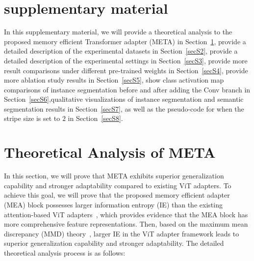 \newpage
\section*{supplementary material}
In this supplementary material, we will provide a theoretical analysis to the proposed memory efficient Transformer adapter (META) in Section~\ref{secS1}, provide a detailed description of the experimental datasets in Section~\ref{secS2}, provide a detailed description of the experimental settings in Section~\ref{secS3},
provide more result comparisons under different pre-trained weights in Section~\ref{secS4},
provide more ablation study results in Section~\ref{secS5}, show class activation map comparisons of instance segmentation before and after adding the Conv branch in Section~\ref{secS6},qualitative visualizations of instance segmentation and semantic segmentation results in Section~\ref{secS7},  as well as the pseudo-code for when the stripe size is set to $2$ in Section~\ref{secS8}. 
\section{Theoretical Analysis of META}
\label{secS1}
{} In this section, we will prove that META exhibits superior generalization capability and stronger adaptability compared to existing ViT adapters. 
%
To achieve this goal, we will prove that the proposed memory efficient adapter (MEA) block possesses larger information entropy (IE) than the existing attention-based ViT adapters~\citep{hu2022lora,jie2023fact,chen2022vision,ma2024segment,luo2023forgery,shao2023deepfake}, which provides evidence that the MEA block has more comprehensive feature representations. Then, based on the maximum mean discrepancy (MMD) theory~\citep{cheng2021neural,arbel2019maximum,wang2021rethinking}, larger IE in the ViT adapter framework leads to superior generalization capability and stronger adaptability. The detailed theoretical analysis process is as follows:


